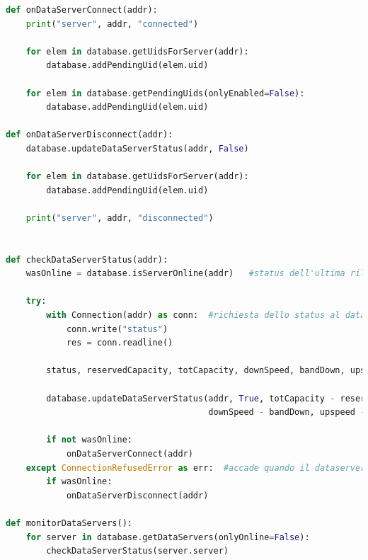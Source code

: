 \documentclass[11pt,a4paper,english]{article}
\begin{document}
\begin{lstlisting}[language=Python, title=Controllo dello stato dei dataserver]
def onDataServerConnect(addr):
    print("server", addr, "connected")

    for elem in database.getUidsForServer(addr):
        database.addPendingUid(elem.uid)

    for elem in database.getPendingUids(onlyEnabled=False):
        database.addPendingUid(elem.uid)

def onDataServerDisconnect(addr):
    database.updateDataServerStatus(addr, False)

    for elem in database.getUidsForServer(addr):
        database.addPendingUid(elem.uid)

    print("server", addr, "disconnected")


def checkDataServerStatus(addr):
    wasOnline = database.isServerOnline(addr)   #status dell'ultima rilevazione
    
    try:
        with Connection(addr) as conn:  #richiesta dello status al dataserver
            conn.write("status")
            res = conn.readline()

        status, reservedCapacity, totCapacity, downSpeed, bandDown, upspeed, bandUp = res
       	
        database.updateDataServerStatus(addr, True, totCapacity - reservedCapacity, totCapacity,
                                        downSpeed - bandDown, upspeed - bandUp)

        if not wasOnline:
            onDataServerConnect(addr)
    except ConnectionRefusedError as err:  #accade quando il dataserver non e' raggiungibile
        if wasOnline:
            onDataServerDisconnect(addr)

def monitorDataServers():
    for server in database.getDataServers(onlyOnline=False):
        checkDataServerStatus(server.server)
\end{lstlisting}
\end{document}
